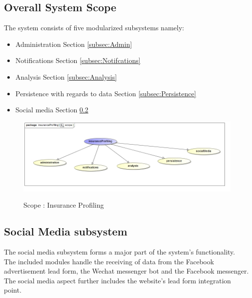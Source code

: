 \documentclass{article}
\begin{document}
	\subsection{Overall System Scope}
	The system consists of five modularized subsystems namely:
	\begin{itemize}
		\item Administration Section \ref{subsec:Admin}
		\item Notifications Section \ref{subsec:Notifcations}
		\item Analysis Section \ref{subsec:Analysis}
		\item Persistence with regards to data Section \ref{subsec:Persistence}
		\item Social media Section \ref{subsec:SocialMedia}
	\end{itemize}
		\begin{figure}[H]
		\includegraphics[width=\textwidth]{images/uc__insuranceProfiling__scope.jpg}  \\
		\caption{Scope : Insurance Profiling}
		\end{figure}
		
		
		\pagebreak
	\subsection{Social Media subsystem}\label{subsec:SocialMedia}
	The social media subsystem forms a major part of the system's functionality. \\The included modules handle the receiving of data from the Facebook advertisement lead form, the Wechat messenger bot and the Facebook messenger. The social media aspect further includes the website's lead form integration point.\\
\end{document}
